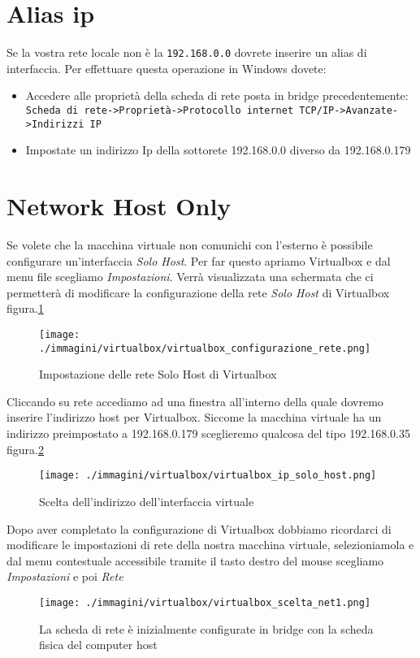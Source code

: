 \section{Alias ip}

Se la vostra rete locale non è la \texttt{192.168.0.0} dovrete inserire un alias di interfaccia. Per effettuare questa operazione in Windows dovete:
\begin{itemize}
 \item Accedere alle proprietà della scheda di rete posta in bridge precedentemente: \texttt{Scheda di rete->Proprietà->Protocollo internet TCP/IP->Avanzate->Indirizzi IP}
\item Impostate un indirizzo Ip della sottorete 192.168.0.0 diverso da 192.168.0.179
\end{itemize}

\section{Network Host Only}
Se volete che la macchina virtuale non comunichi con l'esterno è possibile configurare un'interfaccia \textsl{Solo Host}. Per far questo apriamo Virtualbox e dal menu file scegliamo \textsl{Impostazioni}. Verrà visualizzata una schermata che ci permetterà di modificare la configurazione della rete \textsl{Solo Host} di Virtualbox figura.\ref{fig:virt_imp}
\begin{figure}[H]
 \centering
 \texttt{[image: ./immagini/virtualbox/virtualbox\_configurazione\_rete.png]}
 \caption{Impostazione delle rete Solo Host di Virtualbox}
 \label{fig:virt_imp}
\end{figure}
Cliccando su rete accediamo ad una finestra all'interno della quale dovremo inserire l'indirizzo host per Virtualbox. Siccome la macchina virtuale ha un indirizzo preimpostato a 192.168.0.179 sceglieremo qualcosa del tipo 192.168.0.35 figura.\ref{fig:virt_net}
\begin{figure}[H]
 \centering
 \texttt{[image: ./immagini/virtualbox/virtualbox\_ip\_solo\_host.png]}
 \caption{Scelta dell'indirizzo dell'interfaccia virtuale}
 \label{fig:virt_net}
\end{figure}

Dopo aver completato la configurazione di Virtualbox dobbiamo ricordarci di modificare le impostazioni di rete della nostra macchina virtuale, selezioniamola e dal menu contestuale accessibile tramite il tasto destro del mouse scegliamo \textsl{Impostazioni} e poi \textsl{Rete}
\begin{figure}[H]
 \centering
 \texttt{[image: ./immagini/virtualbox/virtualbox\_scelta\_net1.png]}
 \caption{La scheda di rete è inizialmente configurate in bridge con la scheda fisica del computer host}
 \label{fig:virt_rete_bridge}
\end{figure}

